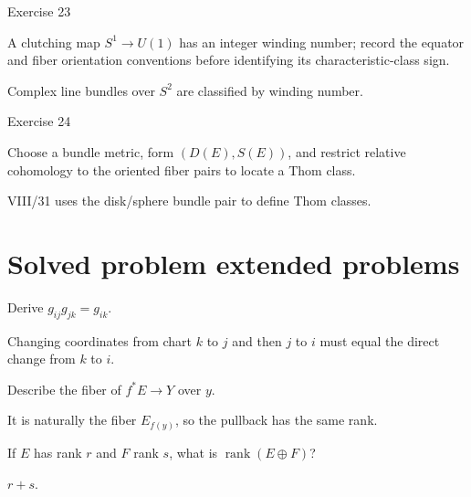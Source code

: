 \begin{exercise}\label{exr:viii30-23}
Exercise 23
\end{exercise}
\begin{hint}
A clutching map \(S^1\to U(1)\) has an integer winding number; record the equator and fiber orientation conventions before identifying its characteristic-class sign.
\end{hint}
\begin{solution}
Complex line bundles over \(S^2\) are classified by winding number.
\end{solution}

\begin{exercise}\label{exr:viii30-24}
Exercise 24
\end{exercise}
\begin{hint}
Choose a bundle metric, form \((D(E),S(E))\), and restrict relative cohomology to the oriented fiber pairs to locate a Thom class.
\end{hint}
\begin{solution}
VIII/31 uses the disk/sphere bundle pair to define Thom classes.
\end{solution}


\section{Solved problem extended problems}

\begin{problem}\label{prob:viii30-01}
Derive \(g_{ij}g_{jk}=g_{ik}\).
\end{problem}
\begin{solution}
Changing coordinates from chart \(k\) to \(j\) and then \(j\) to \(i\) must equal the direct change from \(k\) to \(i\).
\end{solution}

\begin{problem}[Pullback]\label{prob:viii30-02}
Describe the fiber of \(f^*E\to Y\) over \(y\).
\end{problem}
\begin{solution}
It is naturally the fiber \(E_{f(y)}\), so the pullback has the same rank.
\end{solution}

\begin{problem}\label{prob:viii30-03}
If \(E\) has rank \(r\) and \(F\) rank \(s\), what is \(\operatorname{rank}(E\oplus F)\)?
\end{problem}
\begin{solution}
\(r+s\).
\end{solution}

